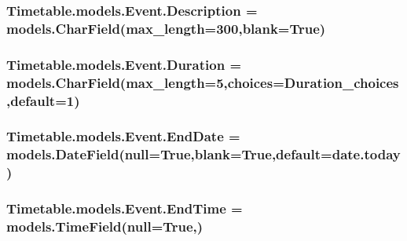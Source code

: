 \subsubsection[{\texorpdfstring{Description}{Description}}]{\setlength{\rightskip}{0pt plus 5cm}Timetable.\+models.\+Event.\+Description = models.\+Char\+Field(max\+\_\+length=300,blank=True)\hspace{0.3cm}{\ttfamily [static]}}\hypertarget{classTimetable_1_1models_1_1Event_aea7440b3b473e3240dcdce84a270e8c3}{}\label{classTimetable_1_1models_1_1Event_aea7440b3b473e3240dcdce84a270e8c3}
\subsubsection[{\texorpdfstring{Duration}{Duration}}]{\setlength{\rightskip}{0pt plus 5cm}Timetable.\+models.\+Event.\+Duration = models.\+Char\+Field(max\+\_\+length=5,choices={\bf Duration\+\_\+choices},default=\textquotesingle{}1\textquotesingle{})\hspace{0.3cm}{\ttfamily [static]}}\hypertarget{classTimetable_1_1models_1_1Event_aa56da6b4d9364d76dddd725d13851f60}{}\label{classTimetable_1_1models_1_1Event_aa56da6b4d9364d76dddd725d13851f60}
\subsubsection[{\texorpdfstring{End\+Date}{EndDate}}]{\setlength{\rightskip}{0pt plus 5cm}Timetable.\+models.\+Event.\+End\+Date = models.\+Date\+Field(null=True,blank=True,default=date.\+today)\hspace{0.3cm}{\ttfamily [static]}}\hypertarget{classTimetable_1_1models_1_1Event_ac5ffd98e09778ffe3e217d3b291b7a0a}{}\label{classTimetable_1_1models_1_1Event_ac5ffd98e09778ffe3e217d3b291b7a0a}
\subsubsection[{\texorpdfstring{End\+Time}{EndTime}}]{\setlength{\rightskip}{0pt plus 5cm}Timetable.\+models.\+Event.\+End\+Time = models.\+Time\+Field(null=True,)\hspace{0.3cm}{\ttfamily [static]}}\hypertarget{classTimetable_1_1models_1_1Event_a4a59dcfcca0b556a92db338024483372}{}\label{classTimetable_1_1models_1_1Event_a4a59dcfcca0b556a92db338024483372}
